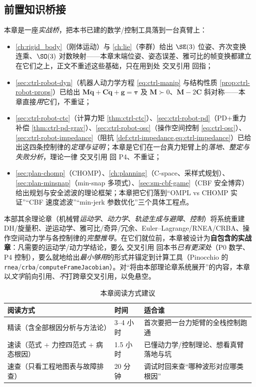 \subsection*{前置知识桥接}
本章是一座\emph{实战桥}，把本书已建的数学/控制工具落到一台真臂上：
\begin{itemize}
  \item \cref{ch:rigid_body}（刚体运动）与 \cref{ch:lie}（李群）给出 $\SE(3)$ 位姿、齐次变换连乘、$\SO(3)$ 对数映射——本章末端位姿、姿态误差、雅可比的帧变换都建立在它们之上，正文不重述这些基础，只在用到处 交叉引用 回指；
  \item \cref{sec:ctrl-robot-dyn}（机器人动力学方程 \cref{eq:ctrl-manip} 与结构性质 \cref{prop:ctrl-robot-props}）已给出 $\mathbf{M}\ddot{\mathbf{q}}+\mathbf{C}\dot{\mathbf{q}}+\mathbf{g}=\boldsymbol{\tau}$ 及 $\mathbf{M}\succ0$、$\dot{\mathbf{M}}-2\mathbf{C}$ 斜对称——本章直接\emph{用}它们，不重证；
  \item \cref{sec:ctrl-robot-ctc}（计算力矩 \cref{thm:ctrl-ctc}）、\cref{sec:ctrl-robot-pd}（PD+重力补偿 \cref{thm:ctrl-pd-grav}）、\cref{sec:ctrl-robot-osc}（操作空间控制 \cref{eq:ctrl-osc}）、\cref{sec:ctrl-robot-impedance}（阻抗 \cref{def:ctrl-impedance,eq:ctrl-impedance}）已给出这四条控制律的\emph{定理与证明}；本章是它们在一台真力矩臂上的\emph{落地、整定与失败分析}，理论一律 交叉引用 回 P4、不重证；
  \item \cref{sec:plan-chomp}（CHOMP）、\cref{ch:planning}（C-space、采样式规划）、\cref{sec:plan-minsnap}（min-snap 多项式）、\cref{sec:sm-cbf-game}（CBF 安全博弈）给出规划与安全滤波的理论框架；本章把它们落到“OMPL vs CHOMP 实证”“CBF 速度滤波”“min-jerk 参数优化”三个具体工程点。
\end{itemize}

\begin{note}\label{note:ap-selfcontained}
本部其余理论章（机械臂\emph{运动学}、\emph{动力学}、\emph{轨迹生成与避障}、\emph{控制}）将系统重建 DH/旋量积、逆运动学、雅可比/奇异/冗余、Euler--Lagrange/RNEA/CRBA、操作空间动力学与各控制律的\emph{完整推导}。在它们就位前，本章被设计为\textbf{自包含的实战章}：凡需要的运动学/动力学结论，要么 交叉引用 回本书\emph{已有更深处}（P0 数学、P4 控制），要么就地给出\emph{最小够用}的形式并锚定到计算工具（Pinocchio 的 \texttt{rnea}/\texttt{crba}/\texttt{computeFrameJacobian}）。对“将由本部理论章系统展开”的内容，本章以\emph{文字}前向引用、\emph{不}打跨章交叉引用，以免悬空。
\end{note}

\begin{table}[H]\centering\small
\caption{本章阅读方式建议}
\begin{tabular}{lll}
\toprule
阅读方式 & 时间 & 适合谁 \\
\midrule
精读（含全部根因分析与方法论） & 3--4 小时 & 首次要把一台力矩臂的全栈控制跑通 \\
速读（范式 + 力控四范式 + 病态根因） & 1.5 小时 & 已懂动力学/控制理论、想看真臂落地与坑 \\
速查（只看工程地图表与故障排查） & 20 分钟 & 调试时回来查“哪种波形对应哪类根因” \\
\bottomrule
\end{tabular}
\end{table}

